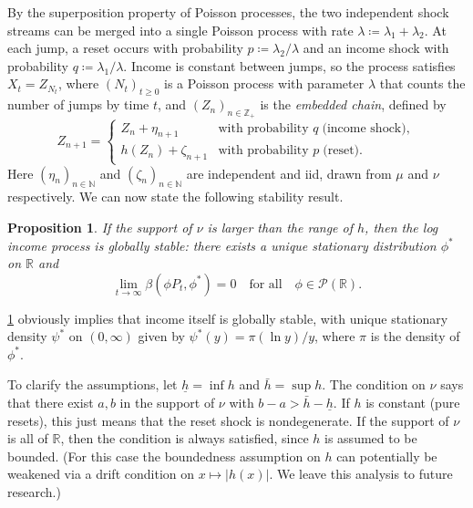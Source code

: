 \documentclass[12pt,reqno]{amsart}
\numberwithin{equation}{section}
\newtheorem{proposition}{Proposition}[section]
\theoremstyle{definition}
\newcommand{\1}{\mathbbm{1}}
\newcommand{\RR}{\mathbb{R}}
\newcommand{\NN}{\mathbb{N}}
\newcommand{\ZZ}{\mathbb{Z}}
\newcommand{\pP}{\mathscr{P}}
\newcommand{\lam}{\lambda}
\newcommand{\navy}[1]{\textit{\textcolor{blue!40!black}{#1}}}
\begin{document}
By the superposition property of Poisson processes, the two independent shock streams
can be merged into a single Poisson process with rate $\lam \coloneq \lam_1 + \lam_2$.  At each jump, a reset
occurs with probability $p\coloneq \lam_2/\lam$ and an income shock with probability $q\coloneq \lam_1/\lam$.
Income is constant between jumps, so the process satisfies $X_t = Z_{N_t}$, where
$(N_t)_{t \geq 0}$ is a Poisson process with parameter $\lam$ that counts the number of jumps by time
$t$, and $(Z_n)_{n \in \ZZ_+}$ is the \navy{embedded chain}, defined by 
%
\begin{equation}\label{eq:purejumpchain}
    Z_{n+1} = 
    \begin{cases}
        Z_n + \eta_{n+1} & \text{with probability } q \; \text{(income shock)},\\
        h(Z_n) + \zeta_{n+1} & \text{with probability } p  \; \text{(reset)}.
    \end{cases}
\end{equation}
%
Here $(\eta_n)_{n \in \NN}$ and $(\zeta_n)_{n \in \NN}$ are independent and {\sc
iid}, drawn from $\mu$ and $\nu$ respectively. We can now state the following stability result.  

\begin{proposition}\label{p:purejumpstable}
    If the support of $\nu$ is larger than the range of $h$, 
    then the log income process is globally stable: there exists a unique
    stationary distribution $\phi^*$ on $\RR$ and
    \begin{equation}\label{eq:purejumpgs}
        \lim_{t \to \infty} \beta(\phi P_t, \phi^*) = 0
        \quad \text{for all} \quad \phi \in \pP(\RR).
    \end{equation}
\end{proposition}

\cref{p:purejumpstable} obviously implies that income itself is globally stable,
with unique stationary density $\psi^*$ on $(0,\infty)$ given by $\psi^*(y) =
\pi(\ln y)/y$, where $\pi$ is the density of $\phi^*$.

To clarify the assumptions, let $\underline{h} = \inf h$ and $\bar{h} = \sup h$.
The condition on $\nu$ says that there exist $a,b$ in the support of
$\nu$ with $b - a > \bar{h} - \underline{h}$.  If $h$ is constant (pure
resets), this just means that the reset shock is nondegenerate.  If the support
of $\nu$ is all of $\RR$, then the condition is always satisfied, since $h$ is
assumed to be bounded.  (For this case the boundedness assumption on $h$ can
potentially be weakened via a drift condition on $x \mapsto |h(x)|$.
We leave this analysis to future research.)
\end{document}
